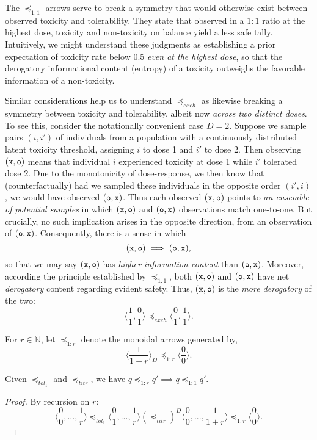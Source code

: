 \documentclass{article}
\newcommand{\N}{\mathbb{N}}
\begin{document}
The $\preceq_{1:1}$ arrows serve to break a symmetry that would otherwise exist between observed toxicity and tolerability.  They state that observed in a $1:1$ ratio at the highest dose, toxicity and non-toxicity on balance yield a less safe tally.  Intuitively, we might understand these judgments as establishing a prior expectation of toxicity rate below 0.5 {\em even at the highest dose}, so that the derogatory informational content (entropy) of a toxicity outweighs the favorable information of a non-toxicity.

Similar considerations help us to understand $\preceq_{exch}$ as likewise breaking a symmetry between toxicity and tolerability, albeit now {\em across two distinct doses}.  To see this, consider the notationally convenient case $D=2$.  Suppose we sample pairs $(i,i')$ of individuals from a population with a continuously distributed latent toxicity threshold, assigning $i$ to dose 1 and $i'$ to dose 2.  Then observing $(\tt{x},\tt{o})$ means that individual $i$ experienced toxicity at dose 1 while $i'$ tolerated dose 2.  Due to the monotonicity of dose-response, we then know that (counterfactually) had we sampled these individuals in the opposite order $(i',i)$, we would have observed $(\tt{o},\tt{x})$.  Thus each observed $(\tt{x},\tt{o})$ points to {\em an ensemble of potential samples} in which $(\tt{x},\tt{o})$ and $(\tt{o},\tt{x})$ observations match one-to-one.  But crucially, no such implication arises in the opposite direction, from an observation of $(\tt{o},\tt{x})$.  Consequently, there is a sense in which
$$
(\tt{x},\tt{o}) \implies (\tt{o},\tt{x}),
$$
so that we may say $(\tt{x},\tt{o})$ has {\em higher information content} than $(\tt{o},\tt{x})$.  Moreover, according the principle established by $\preceq_{1:1}$, both $(\tt{x},\tt{o})$ and $(\tt{o},\tt{x})$ have net {\em derogatory} content regarding evident safety.  Thus, $(\tt{x},\tt{o})$ is the {\em more derogatory} of the two:
$$
\langle\frac{1}{1},\frac{0}{1}\rangle \preceq_{exch} \langle\frac{0}{1},\frac{1}{1}\rangle.
$$

\begin{nota}
  For $r \in \N$, let $\preceq_{1:r}$ denote the monoidal arrows generated by,
  $$
  \langle\frac{1}{1+r}\rangle_D \preceq_{1:r} \langle\frac{0}{0}\rangle.
  $$
\end{nota}

\begin{fact}\label{rimplies}
  Given $\preceq_{tol_1}$ and $\preceq_{titr}$, we have $q \preceq_{1:r} q' \implies q \preceq_{1:1} q'$.
\end{fact}
\begin{proof}
  By recursion on $r$:
  $$
  \langle\frac{0}{0},...,\frac{1}{r}\rangle \preceq_{tol_1} \langle\frac{0}{1},...,\frac{1}{r}\rangle (\preceq_{titr})^D \langle\frac{0}{0},...,\frac{1}{1+r}\rangle \preceq_{1:r} \langle\frac{0}{0}\rangle.
  $$
\end{proof}
\end{document}

